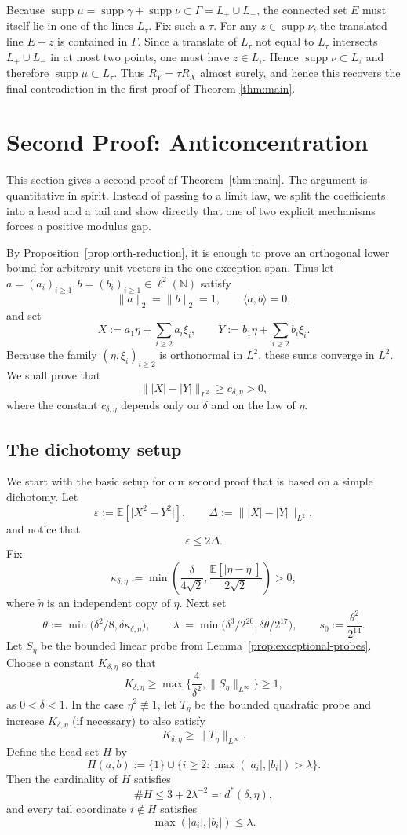 \documentclass[11pt]{amsart}
\numberwithin{equation}{section}
\theoremstyle{definition}
\theoremstyle{remark}
\newcommand{\E}{\mathbb E}
\newcommand{\N}{\mathbb N}
\newcommand{\supp}{\operatorname{supp}}
\newcommand{\eps}{\varepsilon}
\newcommand{\abs}[1]{\lvert #1 \rvert}
\newcommand{\norm}[1]{\lVert #1 \rVert}
\newcommand{\ip}[2]{\langle #1,#2\rangle}
\begin{document}
Because $\supp\mu=\supp\gamma+\supp\nu\subset\Gamma=L_+\cup L_-$, the
connected set $E$ must itself lie in one of the lines $L_\tau$.  Fix such a
$\tau$.  For any $z\in\supp\nu$, the translated line $E+z$ is contained in
$\Gamma$.  Since a translate of $L_\tau$ not equal to $L_\tau$ intersects
$L_+\cup L_-$ in at most two points, one must have $z\in L_\tau$.  Hence
$\supp\nu\subset L_\tau$ and therefore $\supp\mu\subset L_\tau$.  Thus
$R_Y=\tau R_X$ almost surely, and hence this recovers the final contradiction in the first proof of Theorem \ref{thm:main}. 

\section{Second Proof: Anticoncentration}\label{sec:quant-proof}

This section gives a second proof of Theorem~\ref{thm:main}.  The argument is
quantitative in spirit.  Instead of passing to a limit law, we split the
coefficients into a head and a tail and show directly that one of two explicit
mechanisms forces a positive modulus gap.

By Proposition~\ref{prop:orth-reduction}, it is enough to prove an orthogonal
lower bound for arbitrary unit vectors in the one-exception span.  Thus let
$a=(a_i)_{i\ge1}, b=(b_i)_{i\ge1}\in \ell^2(\N)$ satisfy
\[
\norm{a}_2=\norm{b}_2=1,
\qquad
\ip{a}{b}=0,
\]
and set
\[
X:=a_1\eta+\sum_{i\ge2} a_i\xi_i,
\qquad
Y:=b_1\eta+\sum_{i\ge2} b_i\xi_i.
\]
Because the family $(\eta,\xi_i)_{i\ge2}$ is orthonormal in $L^2$, these sums
converge in $L^2$.  We shall prove that
\[
\norm{|X|-|Y|}_{L^2}\ge c_{\delta,\eta}>0,
\]
where the constant $c_{\delta,\eta}$ depends only on $\delta$ and on the law of $\eta$.

\subsection{The dichotomy setup}

We start with the basic setup for our second proof that is based on a simple dichotomy. Let
\[
\eps:=\E[\abs{X^2-Y^2}],
\qquad
\Delta:=\norm{|X|-|Y|}_{L^2},
\]
and notice that
\[
\eps\le 2\Delta.
\]
Fix
\[
\kappa_{\delta,\eta}
:=
\min\left(
\frac{\delta}{4\sqrt2},
\frac{\E[\abs{\eta-\widetilde\eta}]}{2\sqrt2}
\right)>0,
\]
where $\widetilde\eta$ is an independent copy of $\eta$.  Next set
\[
\theta:=\min\bigl(\delta^2/8,\delta\kappa_{\delta,\eta}\bigr),
\qquad
\lambda:=\min\bigl(\delta^3/2^{20},\delta\theta/2^{17}\bigr),
\qquad
s_0:=\frac{\theta^2}{2^{14}}.
\]
Let $S_\eta$ be the bounded linear probe from
Lemma~\ref{prop:exceptional-probes}. Choose a
constant $K_{\delta,\eta}$ so that
\[
K_{\delta,\eta}\ge \max\bigg\{\frac{4}{\delta^2},\norm{S_\eta}_{L^\infty}\bigg\} \ge 1,
\]
as $0<\delta<1$. In the case $\eta^2\not\equiv1$, let
$T_\eta$ be the bounded quadratic probe and increase $K_{\delta,\eta}$ (if necessary) to also satisfy
\[
K_{\delta,\eta}\ge \norm{T_\eta}_{L^\infty}.
\]
Define the head set $H$ by
\[
H(a,b):=\{1\}\cup\{i\ge2:\max(|a_i|,|b_i|)>\lambda\}.
\]
Then the cardinality of $H$ satisfies
\[
\#H\le 3+2\lambda^{-2} \eqqcolon d^{\ast}(\delta,\eta),
\]
and every tail coordinate $i\notin H$ satisfies
\[
\max(|a_i|,|b_i|)\le \lambda.
\]
\end{document}
